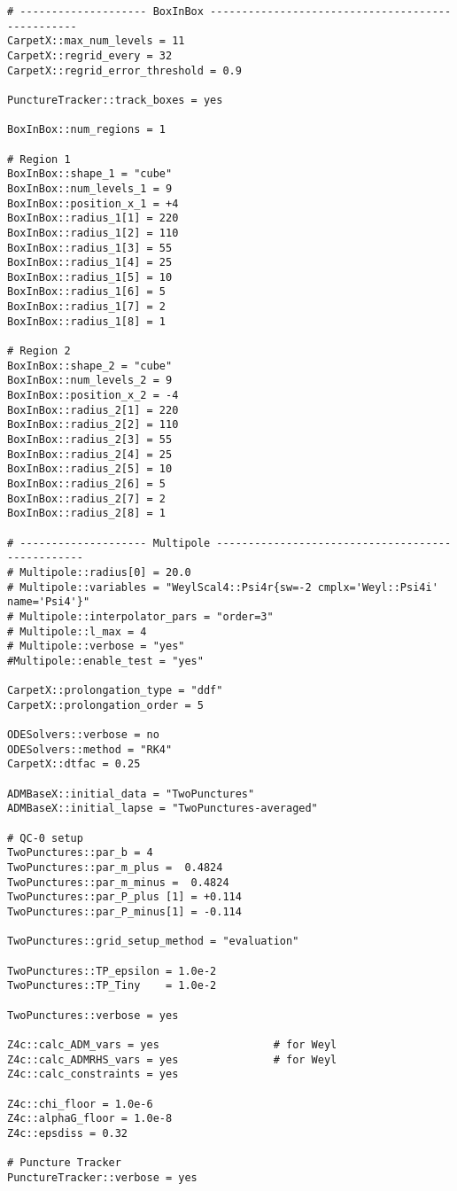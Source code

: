 \begin{verbatim}
# -------------------- BoxInBox -------------------------------------------------
CarpetX::max_num_levels = 11
CarpetX::regrid_every = 32
CarpetX::regrid_error_threshold = 0.9

PunctureTracker::track_boxes = yes

BoxInBox::num_regions = 1

# Region 1
BoxInBox::shape_1 = "cube"
BoxInBox::num_levels_1 = 9
BoxInBox::position_x_1 = +4
BoxInBox::radius_1[1] = 220
BoxInBox::radius_1[2] = 110
BoxInBox::radius_1[3] = 55
BoxInBox::radius_1[4] = 25
BoxInBox::radius_1[5] = 10
BoxInBox::radius_1[6] = 5
BoxInBox::radius_1[7] = 2
BoxInBox::radius_1[8] = 1

# Region 2
BoxInBox::shape_2 = "cube"
BoxInBox::num_levels_2 = 9
BoxInBox::position_x_2 = -4
BoxInBox::radius_2[1] = 220
BoxInBox::radius_2[2] = 110
BoxInBox::radius_2[3] = 55
BoxInBox::radius_2[4] = 25
BoxInBox::radius_2[5] = 10
BoxInBox::radius_2[6] = 5
BoxInBox::radius_2[7] = 2
BoxInBox::radius_2[8] = 1

# -------------------- Multipole -------------------------------------------------
# Multipole::radius[0] = 20.0
# Multipole::variables = "WeylScal4::Psi4r{sw=-2 cmplx='Weyl::Psi4i' name='Psi4'}"
# Multipole::interpolator_pars = "order=3"
# Multipole::l_max = 4
# Multipole::verbose = "yes"
#Multipole::enable_test = "yes"

CarpetX::prolongation_type = "ddf"
CarpetX::prolongation_order = 5

ODESolvers::verbose = no
ODESolvers::method = "RK4"
CarpetX::dtfac = 0.25

ADMBaseX::initial_data = "TwoPunctures"
ADMBaseX::initial_lapse = "TwoPunctures-averaged"

# QC-0 setup
TwoPunctures::par_b = 4
TwoPunctures::par_m_plus =  0.4824
TwoPunctures::par_m_minus =  0.4824
TwoPunctures::par_P_plus [1] = +0.114
TwoPunctures::par_P_minus[1] = -0.114

TwoPunctures::grid_setup_method = "evaluation"

TwoPunctures::TP_epsilon = 1.0e-2
TwoPunctures::TP_Tiny    = 1.0e-2

TwoPunctures::verbose = yes

Z4c::calc_ADM_vars = yes                  # for Weyl
Z4c::calc_ADMRHS_vars = yes               # for Weyl
Z4c::calc_constraints = yes

Z4c::chi_floor = 1.0e-6
Z4c::alphaG_floor = 1.0e-8
Z4c::epsdiss = 0.32

# Puncture Tracker
PunctureTracker::verbose = yes


\end{verbatim}
